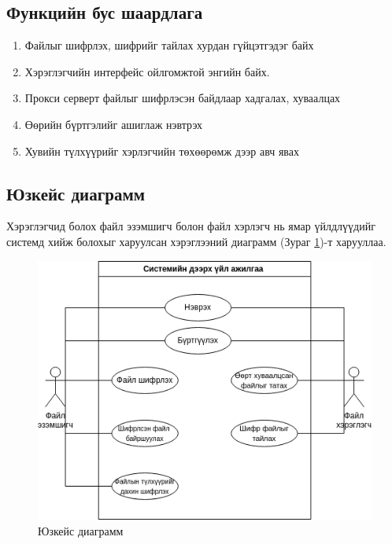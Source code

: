 \subsection*{Функцийн бус шаардлага}
\begin{enumerate}
    \item Файлыг шифрлэх, шифрийг тайлах хурдан гүйцэтгэдэг байх
    \item Хэрэглэгчийн интерфейс ойлгомжтой энгийн байх.
    \item Прокси серверт файлыг шифрлэсэн байдлаар хадгалах, хуваалцах
    \item Өөрийн бүртгэлийг ашиглаж нэвтрэх
    \item Хувийн түлхүүрийг хэрлэгчийн төхөөрөмж дээр авч явах
\end{enumerate}

\subsection*{Юзкейс диаграмм}
Хэрэглэгчид болох файл эзэмшигч болон файл хэрлэгч нь ямар үйлдлүүдийг системд хийж болохыг харуулсан хэрэглээний диаграмм (Зураг \ref{fig:usecase})-т харууллаа.

\begin{figure}[H]
    \centering
    \includegraphics[scale=0.6]{Figures/usecase.drawio.png}
    \caption[Usecase diagram]{Юзкейс диаграмм}
    \label{fig:usecase}
\end{figure}

